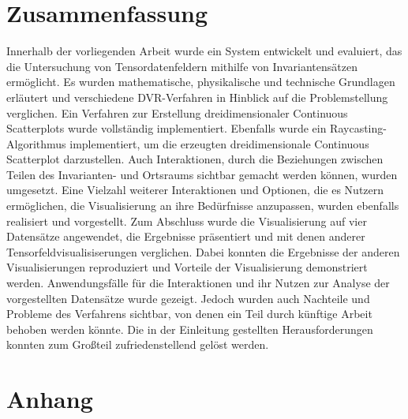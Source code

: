 \documentclass[a4paper,fontsize=12pt,toc=bib,parskip=half,ngerman]{scrartcl}
\begin{document}
\section{Zusammenfassung}
\label{sec:Zusammenfassung}
Innerhalb der vorliegenden Arbeit wurde ein System entwickelt und evaluiert, das die Untersuchung von Tensordatenfeldern mithilfe von Invariantens\"atzen erm\"oglicht. Es wurden mathematische, physikalische und technische Grundlagen erl\"autert und verschiedene DVR-Verfahren in Hinblick auf die Problemstellung verglichen. Ein Verfahren zur Erstellung dreidimensionaler Continuous Scatterplots wurde vollst\"andig implementiert. Ebenfalls wurde ein Raycasting-Algorithmus implementiert, um die erzeugten dreidimensionale Continuous Scatterplot darzustellen. Auch Interaktionen, durch die Beziehungen zwischen Teilen des Invarianten- und Ortsraums sichtbar gemacht werden k\"onnen, wurden umgesetzt. Eine Vielzahl weiterer Interaktionen und Optionen, die es Nutzern erm\"oglichen, die Visualisierung an ihre Bed\"urfnisse anzupassen, wurden ebenfalls realisiert und vorgestellt. Zum Abschluss wurde die Visualisierung auf vier Datens\"atze angewendet, die Ergebnisse pr\"asentiert und mit denen anderer Tensorfeldvisualisiserungen verglichen. Dabei konnten die Ergebnisse der anderen Visualisierungen reproduziert und Vorteile der Visualisierung demonstriert werden. Anwendungsf\"alle f\"ur die Interaktionen und ihr Nutzen zur Analyse der vorgestellten Datens\"atze wurde gezeigt. Jedoch wurden auch Nachteile und Probleme des Verfahrens sichtbar, von denen ein Teil durch k\"unftige Arbeit behoben werden k\"onnte. Die in der Einleitung gestellten Herausforderungen konnten zum Gro{\ss}teil zufriedenstellend gel\"ost werden.


\label{LastPageBeforeRefs}
\clearpage
{}

\printbibliography
\label{LastBibPage}
\clearpage
\section{Anhang}
\end{document}

